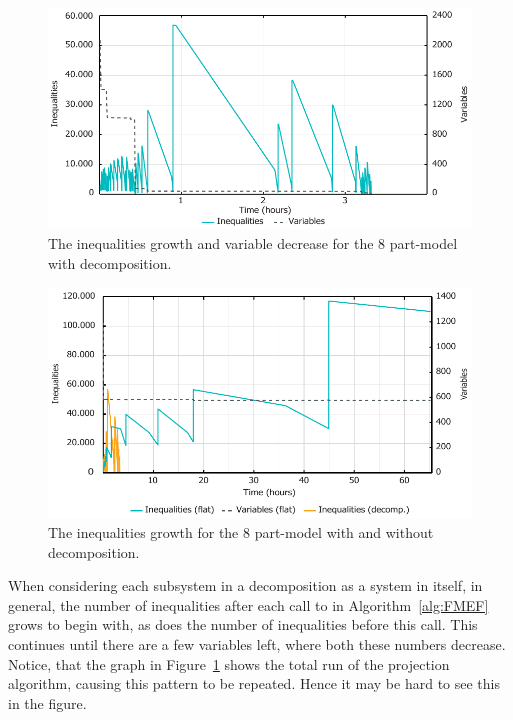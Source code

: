 \documentclass[citeauthoryear]{llncs}
\begin{document}
\begin{figure}[htbp]
	\centering
		\includegraphics[scale=0.7]{figures/decompIneqGrowth2.pdf}
	\caption{The inequalities growth and variable decrease for the 8 part-model with decomposition.}
	\label{fig:8parts}
\end{figure}

\begin{figure}[htbp]
	\centering
		\includegraphics[scale =0.7]{figures/ineqGrowth2.pdf}
	\caption{The inequalities growth for the 8 part-model with and without decomposition.}
	\label{fig:compare}
\end{figure}

When considering each subsystem in a decomposition as a system in itself, in general, the number of inequalities after each call to  in Algorithm~\ref{alg:FMEF} grows to begin with, as does the number of inequalities before this call. This continues until there are a few variables left, where both these numbers decrease. Notice, that the graph in Figure~\ref{fig:8parts} shows the total run of the projection algorithm, causing this pattern to be repeated. Hence it may be hard to see this in the figure.
\end{document}
